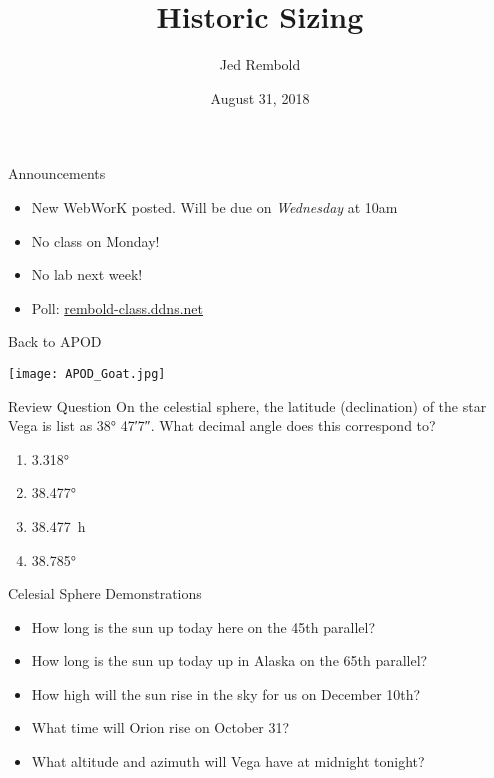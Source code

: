 \documentclass[pdf, aspectratio=169]{beamer}
\title{Historic Sizing}
\date{August 31, 2018}
\author{Jed Rembold}
\begin{document}
\renewcommand*{\theenumi}{\Alph{enumi}}

\begin{frame}{Announcements}
	\begin{itemize}
		\item New WebWorK posted. Will be due on \emph{Wednesday} at 10am
		\item No class on Monday!
		\item No lab next week!
	  \item Poll: \url{rembold-class.ddns.net}
	\end{itemize}
\end{frame}

\begin{frame}{Back to APOD}
	\begin{center}
		\texttt{[image: APOD\_Goat.jpg]}
	\end{center}
\end{frame}

\begin{frame}{Review Question}
 	On the celestial sphere, the latitude (declination) of the star Vega is list as \ang{38; 47;7}. What decimal angle does this correspond to?
	\begin{enumerate}
		\item \ang{3.318}
		\item \ang{38.477}
		\item \SI{38.477}{\hour}
		\item \alert<2>{\ang{38.785}}
	\end{enumerate}
\end{frame}

\begin{frame}{Celesial Sphere Demonstrations}
  \begin{example}
	\begin{itemize}
	  \item How long is the sun up today here on the 45th parallel?
	  \item How long is the sun up today up in Alaska on the 65th parallel?
	  \item How high will the sun rise in the sky for us on December 10th?
	  \item What time will Orion rise on October 31?
	  \item What altitude and azimuth will Vega have at midnight tonight?
	\end{itemize}
  \end{example}
\end{frame}
\end{document}
